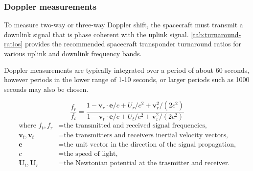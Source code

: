 \subsubsection{Doppler measurements}

To measure two-way or three-way Doppler shift, the spacecraft must transmit a
downlink signal that is phase coherent with the uplink signal.
\autoref{tab:turnaround-ratios} provides the recommended spacecraft transponder
turnaround ratios for various uplink and downlink frequency bands.

Doppler measurements are typically integrated over a period of about 60 seconds, however periods in the lower range of 1-10 seconds, or larger
periods such as 1000 seconds may also be chosen.



\cite{Soffel1989}

\begin{equation}
    \frac{f_r}{f_t} = \frac{
        1-\mathbf{v}_r\cdot{}\mathbf{e}/c + U_r/c^2 +\mathbf{v}_r^2/(2c^2)
    }{
        1-\mathbf{v}_t\cdot{}\mathbf{e}/c + U_t/c^2 +\mathbf{v}_t^2/(2c^2)
    }
\end{equation}
\begin{equation*}
    \begin{aligned}
        \textrm{where  }
        f_t, f_r & = \textrm{the transmitted and received signal frequencies,}            \\
        \mathbf{v}_t, \mathbf{v}_t & = \textrm{the transmitters and receivers inertial velocity vectors,}   \\
        \mathbf{e}                 & = \textrm{the unit vector in the direction of the signal propagation,} \\
        c                          & = \textrm{the speed of light,}                                         \\
        \mathbf{U}_t, \mathbf{U}_r & = \textrm{the Newtonian potential at the trasmitter and receiver.}     \\
    \end{aligned}
\end{equation*}

